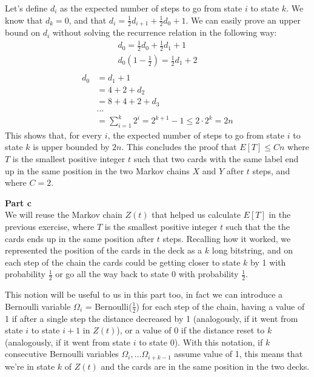 \documentclass[a4paper,german]{article}
\begin{document}
Let's define $d_i$ as the expected number of steps to go from state $i$ to state $k$. We know that $d_k = 0$, and that $d_i = \frac{1}{2} d_{i+1} + \frac{1}{2} d_0 + 1$. We can easily prove an upper bound on $d_i$ without solving the recurrence relation in the following way:
\begin{align*}
 d_0 = \frac{1}{2} d_0 + \frac{1}{2} d_1 + 1\\
 d_0 (1 - \frac{1}{2}) = \frac{1}{2} d_1 + 2\\
\end{align*}
\begin{align*}
	d_0 &= d_1 + 1 \\
		&= 4 + 2 + d_2\\
		&= 8 + 4 + 2 + d_3\\
		& \ldots\\
		&= \sum_{i=1}^k 2^i = 2^{k+1} - 1 \leq 2 \cdot 2^k = 2n
\end{align*}
This shows that, for every $i$, the expected number of steps to go from state $i$ to state $k$ is upper bounded by $2n$.
This concludes the proof that $E[T] \leq Cn$ where $T$ is the smallest positive integer $t$ such that two cards with the same label end up in the same position in the two Markov chains $X$ and $Y$ after $t$ steps, and where $C = 2$.


\vspace{1em}
\noindent 
\textbf{Part c} \\
We will reuse the Markov chain $Z(t)$ that helped us calculate $E[T]$ in the
previous exercise, where $T$ is the smallest positive integer $t$ such that the
the cards ends up in the same position after $t$ steps. Recalling how it worked,
we represented the position of the cards in the deck as a $k$ long bitstring, 
and on each step of the chain the cards could be getting closer to state $k$
by 1 with probability $\frac{1}{2}$ or go all the way back to state $0$ with 
probability $\frac{1}{2}$.

This notion will be useful to us in this part too, in fact we can introduce a
Bernoulli variable $\Omega_i$ = Bernoulli($\frac{1}{2}$) for each step of the
chain, having a value of 1 if after a single step the distance decreased by 1
(analogously, if it went from state $i$ to state $i+1$ in $Z(t)$), or a
value of 0 if the distance reset to $k$ (analogously, if it went from state
$i$ to state $0$). With this notation, if $k$ consecutive Bernoulli
variables $\Omega_i, \ldots \Omega_{i+k-1}$ assume value of 1, this means that
we're in state $k$ of $Z(t)$ and the cards are in the same position in the
two decks.
\end{document}
